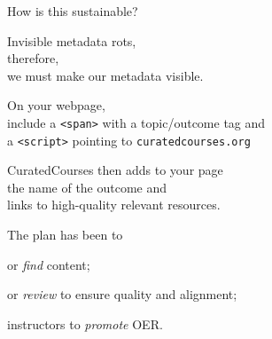 \documentclass{chalkboard}
\begin{document}
\begin{frame}
\end{frame}

\begin{frame}
\end{frame}

\clearbackgroundpicture


\begin{frame}
\end{frame}
\clearbackgroundpicture

\begin{frame}
  \huge

  How is this sustainable?

  \vfill

  Invisible metadata rots, \\
  \quad therefore, \\
  we must make our metadata visible.

\end{frame}

\begin{frame}
\end{frame}
\clearbackgroundpicture

\begin{frame}
  \huge

  On your webpage, \\
  \quad include a \texttt{<span>} with a topic/outcome tag and \\
  \quad a \texttt{<script>} pointing to \texttt{curatedcourses.org}

  \vfill

  CuratedCourses then adds to your page \\
  \quad the name of the outcome and \\
  \quad links to high-quality relevant resources.
\end{frame}

\begin{frame}
  \huge

  \vfill

  The plan has been to
  \begin{description}[empower]
  \item[create] or \textit{find} content;
  \item[curate] or \textit{review} to ensure quality and alignment;
  \item[empower] instructors to \textit{promote} OER.
  \end{description}

  \vfill
\end{frame}
\end{document}
